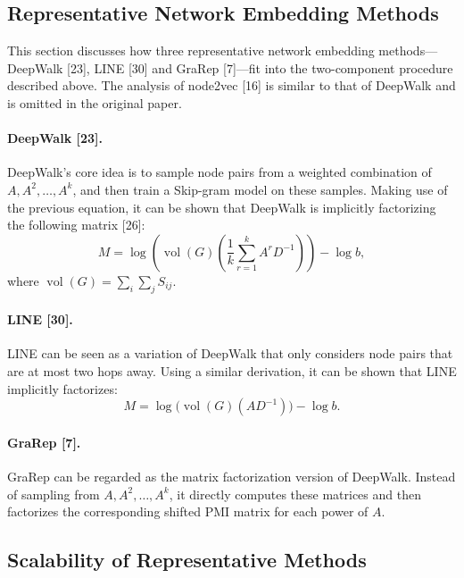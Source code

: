 \documentclass[11pt]{article}
\begin{document}
\subsection{Representative Network Embedding Methods}

This section discusses how three representative network embedding methods---DeepWalk [23], LINE [30] and GraRep [7]---fit into the two-component procedure described above. The analysis of node2vec [16] is similar to that of DeepWalk and is omitted in the original paper.

\paragraph{DeepWalk [23].}
DeepWalk's core idea is to sample node pairs from a weighted combination of $A, A^2, \ldots, A^k$, and then train a Skip-gram model on these samples. Making use of the previous equation, it can be shown that DeepWalk is implicitly factorizing the following matrix [26]:
\begin{equation}
M = \log\left(\operatorname{vol}(G)\left(\frac{1}{k}\sum_{r=1}^{k} A^r D^{-1}\right)\right) - \log b,
\end{equation}
where $\operatorname{vol}(G)=\sum_i \sum_j S_{ij}$.

\paragraph{LINE [30].}
LINE can be seen as a variation of DeepWalk that only considers node pairs that are at most two hops away. Using a similar derivation, it can be shown that LINE implicitly factorizes:
\begin{equation}
M = \log\bigl(\operatorname{vol}(G)(AD^{-1})\bigr) - \log b.
\end{equation}

\paragraph{GraRep [7].}
GraRep can be regarded as the matrix factorization version of DeepWalk. Instead of sampling from $A, A^2, \ldots, A^k$, it directly computes these matrices and then factorizes the corresponding shifted PMI matrix for each power of $A$.

\subsection{Scalability of Representative Methods}
\end{document}

